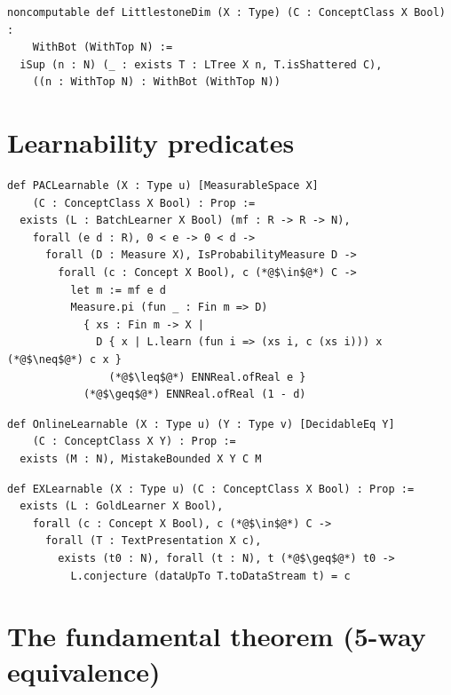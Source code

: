 \begin{lstlisting}[caption={Littlestone dimension (Complexity/GameInfra.lean)}]
noncomputable def LittlestoneDim (X : Type) (C : ConceptClass X Bool) :
    WithBot (WithTop N) :=
  iSup (n : N) (_ : exists T : LTree X n, T.isShattered C),
    ((n : WithTop N) : WithBot (WithTop N))
\end{lstlisting}

\section{Learnability predicates}

\begin{lstlisting}[caption={PAC learnability (Criterion/PAC.lean)}]
def PACLearnable (X : Type u) [MeasurableSpace X]
    (C : ConceptClass X Bool) : Prop :=
  exists (L : BatchLearner X Bool) (mf : R -> R -> N),
    forall (e d : R), 0 < e -> 0 < d ->
      forall (D : Measure X), IsProbabilityMeasure D ->
        forall (c : Concept X Bool), c (*@$\in$@*) C ->
          let m := mf e d
          Measure.pi (fun _ : Fin m => D)
            { xs : Fin m -> X |
              D { x | L.learn (fun i => (xs i, c (xs i))) x (*@$\neq$@*) c x }
                (*@$\leq$@*) ENNReal.ofReal e }
            (*@$\geq$@*) ENNReal.ofReal (1 - d)
\end{lstlisting}

\begin{lstlisting}[caption={Online learnability (Criterion/Online.lean)}]
def OnlineLearnable (X : Type u) (Y : Type v) [DecidableEq Y]
    (C : ConceptClass X Y) : Prop :=
  exists (M : N), MistakeBounded X Y C M
\end{lstlisting}

\begin{lstlisting}[caption={EX-learnability, Gold-style (Criterion/Gold.lean)}]
def EXLearnable (X : Type u) (C : ConceptClass X Bool) : Prop :=
  exists (L : GoldLearner X Bool),
    forall (c : Concept X Bool), c (*@$\in$@*) C ->
      forall (T : TextPresentation X c),
        exists (t0 : N), forall (t : N), t (*@$\geq$@*) t0 ->
          L.conjecture (dataUpTo T.toDataStream t) = c
\end{lstlisting}

\section{The fundamental theorem (5-way equivalence)}

